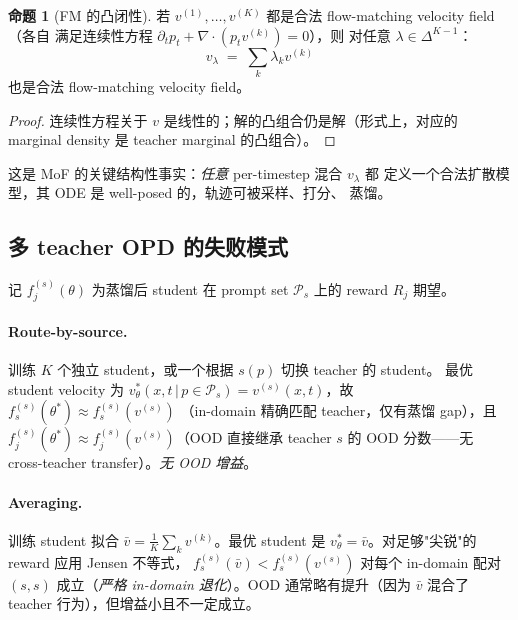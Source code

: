 \documentclass[11pt,a4paper]{article}
\theoremstyle{definition}
\newtheorem{proposition}{命题}
\begin{document}
\begin{proposition}[FM 的凸闭性]
\label{prop:convex_fm}
若 $v^{(1)}, \ldots, v^{(K)}$ 都是合法 flow-matching velocity field（各自
满足连续性方程 $\partial_t p_t + \nabla \cdot (p_t v^{(k)}) = 0$），则
对任意 $\lambda \in \Delta^{K-1}$：
\begin{equation}
v_\lambda \;=\; \sum_k \lambda_k v^{(k)}
\end{equation}
也是合法 flow-matching velocity field。
\end{proposition}

\begin{proof}
连续性方程关于 $v$ 是线性的；解的凸组合仍是解（形式上，对应的
marginal density 是 teacher marginal 的凸组合）。
\end{proof}

这是 MoF 的关键结构性事实：\emph{任意} per-timestep 混合 $v_\lambda$ 都
定义一个合法扩散模型，其 ODE 是 well-posed 的，轨迹可被采样、打分、
蒸馏。

\subsection{多 teacher OPD 的失败模式}
\label{ssec:opd_failures}

记 $f_j^{(s)}(\theta)$ 为蒸馏后 student 在 prompt set $\mathcal{P}_s$
上的 reward $R_j$ 期望。

\paragraph{Route-by-source.}
训练 $K$ 个独立 student，或一个根据 $s(p)$ 切换 teacher 的 student。
最优 student velocity 为 $v_\theta^*(x, t \,|\, p \in \mathcal{P}_s) =
v^{(s)}(x, t)$，故 $f_s^{(s)}(\theta^*) \approx f_s^{(s)}(v^{(s)})$
（in-domain 精确匹配 teacher，仅有蒸馏 gap），且
$f_j^{(s)}(\theta^*) \approx f_j^{(s)}(v^{(s)})$（OOD 直接继承 teacher
$s$ 的 OOD 分数——无 cross-teacher transfer）。\emph{无 OOD 增益}。

\paragraph{Averaging.}
训练 student 拟合 $\bar v = \tfrac{1}{K} \sum_k v^{(k)}$。最优 student
是 $v_\theta^* = \bar v$。对足够"尖锐"的 reward 应用 Jensen 不等式，
$f_s^{(s)}(\bar v) < f_s^{(s)}(v^{(s)})$ 对每个 in-domain 配对 $(s, s)$
成立（\emph{严格 in-domain 退化}）。OOD 通常略有提升（因为 $\bar v$
混合了 teacher 行为），但增益小且不一定成立。

\medskip
\end{document}
